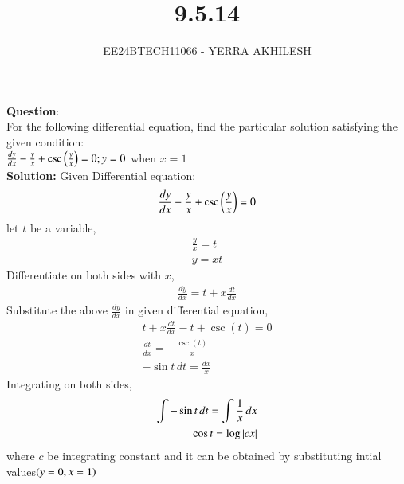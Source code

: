 \documentclass[journal]{IEEEtran}
\begin{document}

\vspace{3cm}

\title{9.5.14}
\author{EE24BTECH11066 - YERRA AKHILESH}
{\let\newpage\relax\maketitle}

\renewcommand{\thefigure}{\theenumi}
\renewcommand{\thetable}{\theenumi}
\setlength{\intextsep}{10pt} %

\renewcommand{\thetable}{\theenumi}
\textbf{Question}:\\
For the following differential equation, find the particular solution satisfying the given condition:\\

$\frac{dy}{dx} - \frac{y}{x} + \csc \left(\frac{y}{x}\right) = 0; y=0$ when $x=1$\\

\textbf{Solution: }
Given  Differential equation:   
\begin{align}
    \frac{dy}{dx} - \frac{y}{x} + \csc \left(\frac{y}{x}\right)=0
\end{align}
let $t$ be a variable,
\begin{align}
    \frac{y}{x} = t\\
    y=xt
\end{align}
Differentiate on both sides with $x$,
\begin{align}
    \frac{dy}{dx} = t + x\frac{dt}{dx}
\end{align}
Substitute the above $\frac{dy}{dx}$ in given differential equation,
\begin{align}
    t+x\frac{dt}{dx}-t+\csc(t)=0\\
    \frac{dt}{dx}= -\frac{\csc(t)}{x}\\
    -\sin t \, dt = \frac{dx}{x}
\end{align}
Integrating on both sides, 
\begin{align}
    \int -\sin t \, dt = \int \frac{1}{x} \, dx\\
    \cos t = \log \left\vert cx\right\vert
\end{align}
where $c$ be integrating constant and it can be obtained by substituting intial values$\left(y=0, x=1\right)$\\
\end{document}
